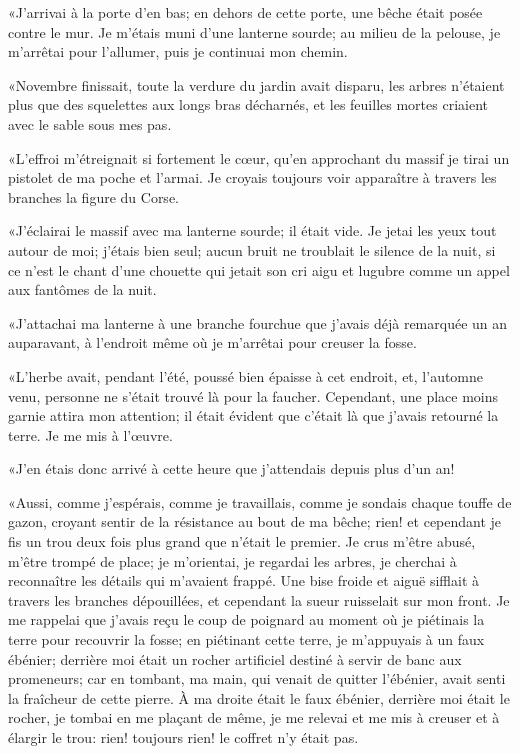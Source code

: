 «J'arrivai à la porte d'en bas; en dehors de cette porte, une bêche était posée contre le mur. Je m'étais muni d'une lanterne sourde; au milieu de la pelouse, je m'arrêtai pour l'allumer, puis je continuai mon chemin. 

«Novembre finissait, toute la verdure du jardin avait disparu, les arbres n'étaient plus que des squelettes aux longs bras décharnés, et les feuilles mortes criaient avec le sable sous mes pas. 

«L'effroi m'étreignait si fortement le cœur, qu'en approchant du massif je tirai un pistolet de ma poche et l'armai. Je croyais toujours voir apparaître à travers les branches la figure du Corse. 

«J'éclairai le massif avec ma lanterne sourde; il était vide. Je jetai les yeux tout autour de moi; j'étais bien seul; aucun bruit ne troublait le silence de la nuit, si ce n'est le chant d'une chouette qui jetait son cri aigu et lugubre comme un appel aux fantômes de la nuit. 

«J'attachai ma lanterne à une branche fourchue que j'avais déjà remarquée un an auparavant, à l'endroit même où je m'arrêtai pour creuser la fosse. 

«L'herbe avait, pendant l'été, poussé bien épaisse à cet endroit, et, l'automne venu, personne ne s'était trouvé là pour la faucher. Cependant, une place moins garnie attira mon attention; il était évident que c'était là que j'avais retourné la terre. Je me mis à l'œuvre. 

«J'en étais donc arrivé à cette heure que j'attendais depuis plus d'un an! 

«Aussi, comme j'espérais, comme je travaillais, comme je sondais chaque touffe de gazon, croyant sentir de la résistance au bout de ma bêche; rien! et cependant je fis un trou deux fois plus grand que n'était le premier. Je crus m'être abusé, m'être trompé de place; je m'orientai, je regardai les arbres, je cherchai à reconnaître les détails qui m'avaient frappé. Une bise froide et aiguë sifflait à travers les branches dépouillées, et cependant la sueur ruisselait sur mon front. Je me rappelai que j'avais reçu le coup de poignard au moment où je piétinais la terre pour recouvrir la fosse; en piétinant cette terre, je m'appuyais à un faux ébénier; derrière moi était un rocher artificiel destiné à servir de banc aux promeneurs; car en tombant, ma main, qui venait de quitter l'ébénier, avait senti la fraîcheur de cette pierre. À ma droite était le faux ébénier, derrière moi était le rocher, je tombai en me plaçant de même, je me relevai et me mis à creuser et à élargir le trou: rien! toujours rien! le coffret n'y était pas.  

